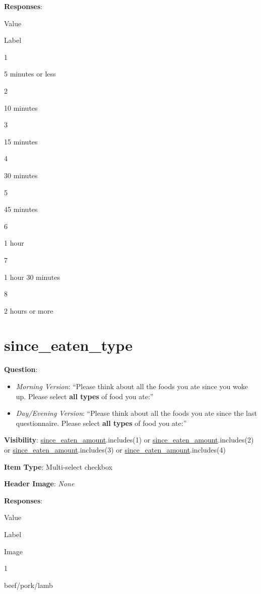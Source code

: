 \documentclass[]{book}
\providecommand{\tightlist}{%
  \setlength{\itemsep}{0pt}\setlength{\parskip}{0pt}}
\begin{document}
\textbf{Responses}:

Value

Label

1

5 minutes or less

2

10 minutes

3

15 minutes

4

30 minutes

5

45 minutes

6

1 hour

7

1 hour 30 minutes

8

2 hours or more

\hypertarget{since_eaten_type}{%
\section{since\_eaten\_type}\label{since_eaten_type}}

\textbf{Question}:

\begin{itemize}
\tightlist
\item
  \emph{Morning Version}: ``Please think about all the foods you ate since you woke up. Please select \textbf{all types} of food you ate:''
\item
  \emph{Day/Evening Version}: ``Please think about all the foods you ate since the last questionnaire. Please select \textbf{all types} of food you ate:''
\end{itemize}

\textbf{Visibility}: \protect\hyperlink{since_eaten_amount}{since\_eaten\_amount}.includes(1) or \protect\hyperlink{since_eaten_amount}{since\_eaten\_amount}.includes(2) or \protect\hyperlink{since_eaten_amount}{since\_eaten\_amount}.includes(3) or \protect\hyperlink{since_eaten_amount}{since\_eaten\_amount}.includes(4)

\textbf{Item Type}: Multi-select checkbox

\textbf{Header Image}: \emph{None}

\textbf{Responses}:

Value

Label

Image

1

beef/pork/lamb
\end{document}
